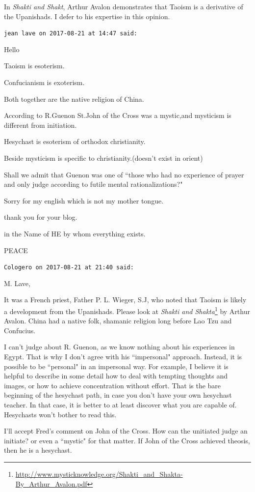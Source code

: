 \begin{footnotesize}
\begin{sffamily}
In \emph{Shakti and Shakt}, Arthur Avalon demonstrates that Taoism is a derivative of the Upanishads. I defer to his expertise in this opinion.


\hfill

\texttt{jean lave on 2017-08-21 at 14:47 said: }

Hello

Taoism is esoterism.

Confucianism is exoterism.

Both together are the native religion of China.

According to R.Guenon St.John of the Cross was a mystic,and mysticism is different from initiation.

Hesychast is esoterism of orthodox christianity.

Beside mysticism is specific to christianity.(doesn't exist in orient)

Shall we admit that Guenon was one of ``those who had no experience of prayer and only judge according to futile mental rationalizations?"

Sorry for my english which is not my mother tongue.

thank you for your blog.

in the Name of HE by whom everything exists.

PEACE


\hfill

\texttt{Cologero on 2017-08-21 at 21:40 said: }

M. Lave,

It was a French priest, Father P. L. Wieger, S.J, who noted that Taoism is likely a development from the Upanishads. Please look at \textit{Shakti and Shakta}\footnote{\url{http://www.mysticknowledge.org/Shakti_and_Shakta-By_Arthur_Avalon.pdf}} by Arthur Avalon. China had a native folk, shamanic religion long before Lao Tzu and Confucius. 

I can't judge about R. Guenon, as we know nothing about his experiences in Egypt. That is why I don't agree with his ``impersonal" approach. Instead, it is possible to be ``personal" in an impersonal way. For example, I believe it is helpful to describe in some detail how to deal with tempting thoughts and images, or how to achieve concentration without effort. That is the bare beginning of the hesychast path, in case you don't have your own hesychast teacher. In that case, it is better to at least discover what you are capable of. Hesychasts won't bother to read this.

I'll accept Fred's comment on John of the Cross. How can the unitiated judge an initiate? or even a ``mystic" for that matter. If John of the Cross achieved theosis, then he is a hesychast.



\end{sffamily}
\end{footnotesize}
